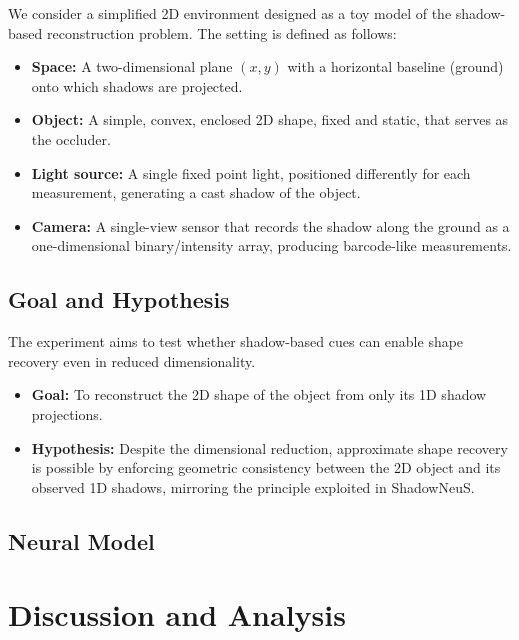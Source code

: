 \documentclass[12pt,a4paper]{article}
\theoremstyle{definition}
\begin{document}
We consider a simplified 2D environment designed as a toy model of the shadow-based reconstruction problem. The setting is defined as follows:
\begin{itemize}[noitemsep, topsep=0pt]
    \item \textbf{Space:} A two-dimensional plane $(x,y)$ with a horizontal baseline (ground) onto which shadows are projected.
    \item \textbf{Object:} A simple, convex, enclosed 2D shape, fixed and static, that serves as the occluder.
    \item \textbf{Light source:} A single fixed point light, positioned differently for each measurement, generating a cast shadow of the object.
    \item \textbf{Camera:} A single-view sensor that records the shadow along the ground as a one-dimensional binary/intensity array, producing barcode-like measurements.
\end{itemize}

\vspace{-1em}

\subsection{Goal and Hypothesis}

The experiment aims to test whether shadow-based cues can enable shape recovery even in reduced dimensionality.
\begin{itemize}[noitemsep, topsep=0pt]
    \item \textbf{Goal:} To reconstruct the 2D shape of the object from only its 1D shadow projections.
    \item \textbf{Hypothesis:} Despite the dimensional reduction, approximate shape recovery is possible by enforcing geometric consistency between the 2D object and its observed 1D shadows, mirroring the principle exploited in ShadowNeuS.
\end{itemize}

\newpage

\subsection{Neural Model}





\section{Discussion and Analysis}
\end{document}
